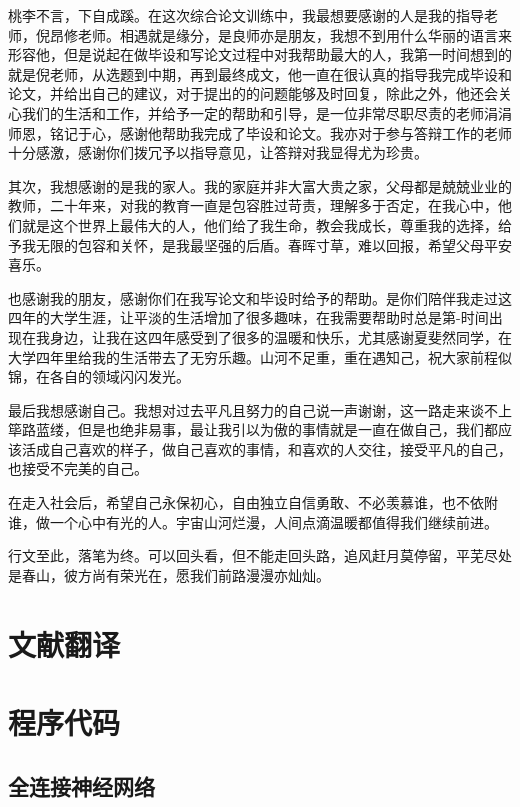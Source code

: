 \documentclass[12pt,a4paper]{amsart}
\begin{document}
桃李不言，下自成蹊。在这次综合论文训练中，我最想要感谢的人是我的指导老师，倪昂修老师。相遇就是缘分，是良师亦是朋友，我想不到用什么华丽的语言来形容他，但是说起在做毕设和写论文过程中对我帮助最大的人，我第一时间想到的就是倪老师，从选题到中期，再到最终成文，他一直在很认真的指导我完成毕设和论文，并给出自己的建议，对于提出的的问题能够及时回复，除此之外，他还会关心我们的生活和工作，并给予一定的帮助和引导，是一位非常尽职尽责的老师涓涓师恩，铭记于心，感谢他帮助我完成了毕设和论文。我亦对于参与答辩工作的老师十分感激，感谢你们拨冗予以指导意见，让答辩对我显得尤为珍贵。

其次，我想感谢的是我的家人。我的家庭并非大富大贵之家，父母都是兢兢业业的教师，二十年来，对我的教育一直是包容胜过苛责，理解多于否定，在我心中，他们就是这个世界上最伟大的人，他们给了我生命，教会我成长，尊重我的选择，给予我无限的包容和关怀，是我最坚强的后盾。春晖寸草，难以回报，希望父母平安喜乐。

也感谢我的朋友，感谢你们在我写论文和毕设时给予的帮助。是你们陪伴我走过这四年的大学生涯，让平淡的生活增加了很多趣味，在我需要帮助时总是第-时间出现在我身边，让我在这四年感受到了很多的温暖和快乐，尤其感谢夏斐然同学，在大学四年里给我的生活带去了无穷乐趣。山河不足重，重在遇知己，祝大家前程似锦，在各自的领域闪闪发光。

最后我想感谢自己。我想对过去平凡且努力的自己说一声谢谢，这一路走来谈不上筚路蓝缕，但是也绝非易事，最让我引以为傲的事情就是一直在做自己，我们都应该活成自己喜欢的样子，做自己喜欢的事情，和喜欢的人交往，接受平凡的自己，也接受不完美的自己。

在走入社会后，希望自己永保初心，自由独立自信勇敢、不必羡慕谁，也不依附谁，做一个心中有光的人。宇宙山河烂漫，人间点滴温暖都值得我们继续前进。

行文至此，落笔为终。可以回头看，但不能走回头路，追风赶月莫停留，平芜尽处是春山，彼方尚有荣光在，愿我们前路漫漫亦灿灿。

{\footnotesize}

\appendix

\section{文献翻译}

\section{程序代码} \label{sec:code}

\subsection{全连接神经网络}
\end{document}
